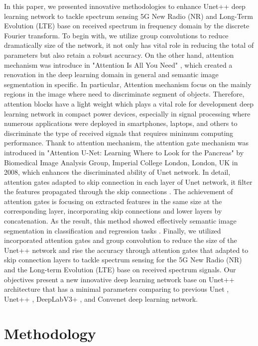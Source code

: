 \documentclass[journal]{IEEEtran} %
\begin{document}
In this paper, we presented innovative methodologies to enhance Unet++ deep learning network to tackle spectrum sensing 5G New Radio (NR) and Long-Term Evolution (LTE) base on received spectrum in frequency domain by the discrete Fourier transform. To begin with, we utilize group convolutions \cite{b9} to reduce dramatically size of the network, it not only has vital role in reducing the total of parameters but also retain a robust accuracy. On the other hand, attention mechanism was introduce in "Attention Is All You Need" \cite{b4}, which created a renovation in the deep learning domain in general and semantic image segmentation in specific. In particular, Attention mechanism focus on the mainly regions in the image where need to discriminate segment of objects. Therefore, attention blocks have a light weight which plays a vital role for development deep learning network in compact power devices, especially in signal processing where numerous applications were deployed in smartphones, laptops, and others to discriminate the type of received signals that requires minimum computing performance. Thank to attention mechanism, the attention gate mechanism was introduced in "Attention U-Net: Learning Where to Look for the Pancreas" \cite{b3} by Biomedical Image Analysis Group, Imperial College London, London, UK in 2008, which enhances the discriminated ability of Unet network. In detail, attention gates adapted to skip connection in each layer of Unet network, it filter the features propagated through the skip connections \cite{b3}. The achievement of attention gates is focusing on extracted features in the same size at the corresponding layer, incorporating skip connections and lower layers by concatenation. As the result, this method showed effectively semantic image segmentation in classification and regression tasks \cite{b3}. Finally, we utilized incorporated attention gates and group convolution to reduce the size of the Unet++ network and rise the accuracy through attention gates that adapted to skip connection layers to tackle spectrum sensing for the 5G New Radio (NR) and the Long-term Evolution (LTE) base on received spectrum signals. Our objectives present a new innovative deep learning network base on Unet++ architecture that has a minimal parameters comparing to previous Unet \cite{b5}, Unet++ \cite{b6}, DeepLabV3+ \cite{b2}, and Convenet \cite{b1} deep learning network.


\section{Methodology}
\end{document}
